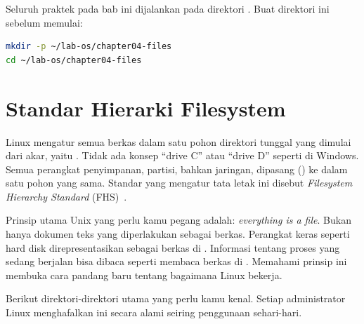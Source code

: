 \begin{notebox}
Seluruh praktek pada bab ini dijalankan pada direktori .
Buat direktori ini sebelum memulai:
\begin{lstlisting}[language=bash]
mkdir -p ~/lab-os/chapter04-files
cd ~/lab-os/chapter04-files
\end{lstlisting}
\end{notebox}

\section{Standar Hierarki Filesystem}
\label{sec:fhs}

Linux mengatur semua berkas dalam satu pohon direktori tunggal yang dimulai dari akar,
yaitu \dir{/}. Tidak ada konsep ``drive C'' atau ``drive D'' seperti di Windows. Semua
perangkat penyimpanan, partisi, bahkan  jaringan, dipasang () ke
dalam satu pohon yang sama. Standar yang mengatur tata letak ini disebut
\textit{Filesystem Hierarchy Standard} (FHS)~\cite{fhs2015}.

Prinsip utama Unix yang perlu kamu pegang adalah: \textit{everything is a file}. Bukan
hanya dokumen teks yang diperlakukan sebagai berkas. Perangkat keras seperti hard disk
direpresentasikan sebagai berkas di . Informasi tentang proses yang sedang
berjalan bisa dibaca seperti membaca berkas di . Memahami prinsip ini membuka
cara pandang baru tentang bagaimana Linux bekerja.

Berikut direktori-direktori utama yang perlu kamu kenal. Setiap administrator Linux
menghafalkan ini secara alami seiring penggunaan sehari-hari.

